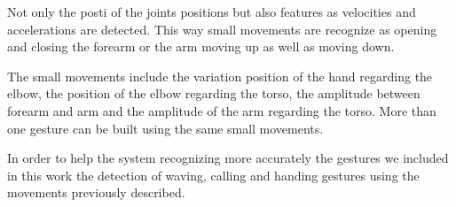  
Not only the posti of the joints positions but also features as velocities and accelerations are detected. This way small movements are recognize as opening and closing the forearm or the arm moving up as well as moving down. 

The small movements include the variation position of the hand regarding the elbow, the position of the elbow regarding the torso, the amplitude between forearm and arm and the amplitude of the arm regarding the torso. More than one gesture can be built using the same small movements.

In order to help the system recognizing more accurately the gestures we included in this work the detection of waving, calling and handing gestures using the movements previously described.

